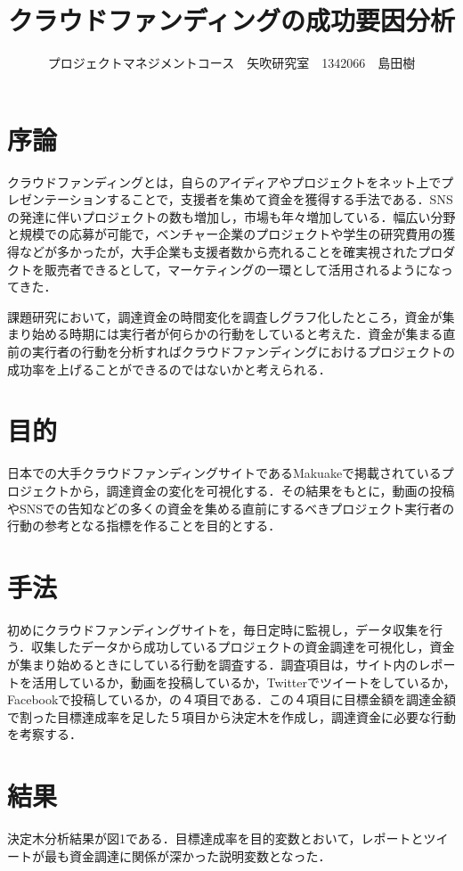 \documentclass[uplatex,twocolumn,dvipdfmx]{jsarticle}
\title{\vspace{-5mm}\fontsize{14pt}{0pt}\selectfont クラウドファンディングの成功要因分析}
\author{\normalsize プロジェクトマネジメントコース　矢吹研究室　1342066　島田樹}
\date{}
\begin{document}
\fontsize{10.5pt}{\baselineskip}\selectfont
\maketitle





\section{序論}
クラウドファンディング\cite{wiki}とは，自らのアイディアやプロジェクトをネット上でプレゼンテーションすることで，支援者を集めて資金を獲得する手法である．SNSの発達に伴いプロジェクトの数も増加し，市場も年々増加している\cite{visualizing}．幅広い分野と規模での応募が可能で，ベンチャー企業のプロジェクトや学生の研究費用の獲得などが多かったが，大手企業も支援者数から売れることを確実視されたプロダクトを販売者できるとして，マーケティングの一環として活用されるようになってきた．

課題研究において，調達資金の時間変化を調査しグラフ化したところ，資金が集まり始める時期には実行者が何らかの行動をしていると考えた．資金が集まる直前の実行者の行動を分析すればクラウドファンディングにおけるプロジェクトの成功率を上げることができるのではないかと考えられる．


\section{目的}
日本での大手クラウドファンディングサイトであるMakuakeで掲載されているプロジェクトから，調達資金の変化を可視化する．その結果をもとに，動画の投稿やSNSでの告知などの多くの資金を集める直前にするべきプロジェクト実行者の行動の参考となる指標を作ることを目的とする．


\section{手法}
初めにクラウドファンディングサイトを，毎日定時に監視し，データ収集を行う．収集したデータから成功しているプロジェクトの資金調達を可視化し，資金が集まり始めるときにしている行動を調査する．調査項目は，サイト内のレポートを活用しているか，動画を投稿しているか，Twitterでツイートをしているか，Facebookで投稿しているか，の４項目である．この４項目に目標金額を調達金額で割った目標達成率を足した５項目から決定木を作成し，調達資金に必要な行動を考察する．


\section{結果}
決定木分析結果が図1である．目標達成率を目的変数とおいて，レポートとツイートが最も資金調達に関係が深かった説明変数となった．
\end{document}
